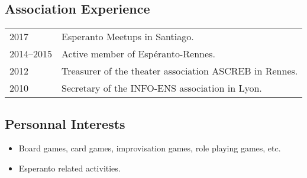\documentclass[12pt,a4paper]{article}
\makeatletter
\newenvironment{datecvsection}[1]%
               {\subsection*{#1}%
                 \noindent \begin{tabular}{@{}p{\annee}p{\texte}@{}}}
               {\end{tabular}}
\newenvironment{itemcvsection}[1]%
               {\subsection*{#1}\begin{itemize}}
               {\end{itemize}}
\newcommand\placeName{}
\makeatother
\begin{document}
\begin{datecvsection}{Association Experience}

    2017 & Esperanto Meetups in \placeName{Santiago}. \\
    2014–2015 & Active member of {Espéranto-Rennes}. \\
	2012 & Treasurer of the theater association {ASCREB} in \placeName{Rennes}. \\
	2010 & Secretary of the \textsc{INFO-ENS} association in \placeName{Lyon}. \\

\end{datecvsection}

\begin{itemcvsection}{Personnal Interests}

	\item Board games, card games, improvisation games, role playing games, etc.
    \item Esperanto related activities.

\end{itemcvsection}
\end{document}
